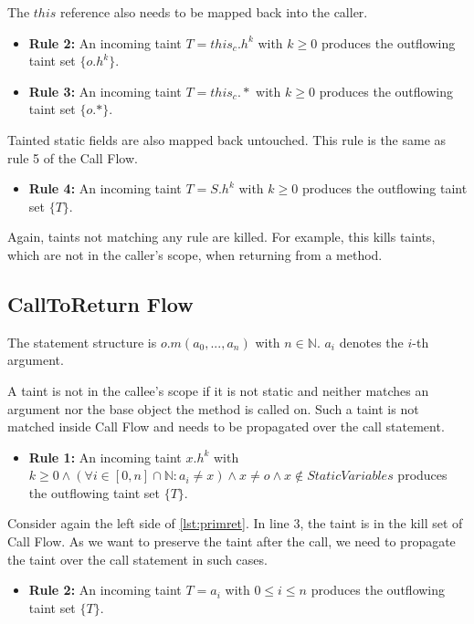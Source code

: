 \documentclass[../draft.tex]{subfiles}
\begin{document}
    The $\mathit{this}$ reference also needs to be mapped back into the caller.
    \begin{itemize}
        \item[] \textbf{Rule 2:} An incoming taint $T = \mathit{this}_c.h^k$ with $k \geq 0$ produces the outflowing taint set $\{o.h^k\}$. 
        \item[] \textbf{Rule 3:} An incoming taint $T = \mathit{this}_c.*$ with $k \geq 0$ produces the outflowing taint set $\{o.*\}$.
    \end{itemize}
    
    Tainted static fields are also mapped back untouched. This rule is the same as rule 5 of the Call Flow.
    \begin{itemize}
        \item[] \textbf{Rule 4:} An incoming taint $T = S.h^k$ with $k \geq 0$ produces the outflowing taint set $\{T\}$. 
    \end{itemize}
    
    Again, taints not matching any rule are killed. For example, this kills taints, which are not in the caller's scope, when returning from a method.

    \subsection{CallToReturn Flow}
    The statement structure is $o.m(a_0, ..., a_n)$ with $n \in \mathbb{N}$. $a_i$ denotes the $i$-th argument.

    A taint is not in the callee's scope if it is not static and neither matches an argument nor the base object the method is called on. Such a taint is not matched inside Call Flow and needs to be propagated over the call statement.
    \begin{itemize}
        \item[] \textbf{Rule 1:} An incoming taint $x.h^k$ with $k \geq 0 \land \left(\forall i \in [0, n] \cap \mathbb{N}: a_i \neq x\right) \land x \neq o \land x \notin \mathit{StaticVariables}$ produces the outflowing taint set $\{T\}$. 
    \end{itemize}

    Consider again the left side of \autoref{lst:primret}. In line 3, the taint is in the kill set of Call Flow. As we want to preserve the taint after the call, we need to propagate the taint over the call statement in such cases. 
    \begin{itemize}
        \item[] \textbf{Rule 2:} An incoming taint $T = a_i$ with $0 \leq i \leq n$ produces the outflowing taint set $\{T\}$. 
    \end{itemize}
        
\end{document}
